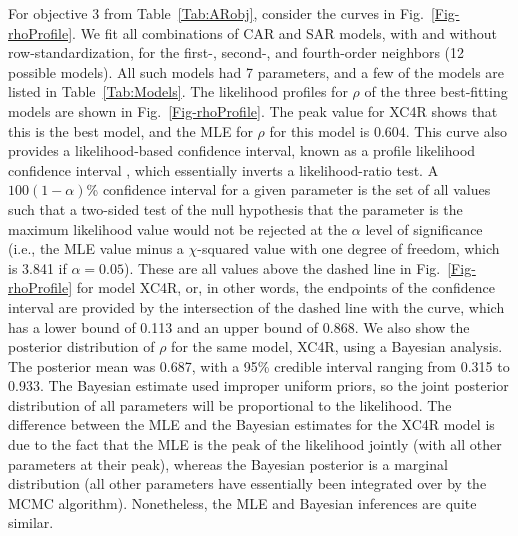 For objective 3 from Table~\ref{Tab:ARobj}, consider the curves in Fig.~\ref{Fig-rhoProfile}.  We fit all combinations of CAR and SAR models, with and without row-standardization, for the first-, second-, and fourth-order neighbors (12 possible models).  All such models had 7 parameters, and a few of the models are listed in Table~\ref{Tab:Models}. The likelihood profiles for $\rho$ of the three best-fitting models are shown in Fig.~\ref{Fig-rhoProfile}. The peak value for XC4R shows that this is the best model, and the MLE for $\rho$ for this model is 0.604.  This curve also provides a likelihood-based confidence interval, known as a profile likelihood confidence interval \citep{Box:Cox:anal:1964}, which essentially inverts a likelihood-ratio test. A $100(1 - \alpha)$\% confidence interval for a given parameter is the set of all values such that a two-sided test of the null hypothesis that the parameter is the maximum likelihood value would not be rejected at the $\alpha$ level of significance (i.e., the MLE value minus a $\chi$-squared value with one degree of freedom, which is 3.841 if $\alpha = 0.05$).  These are all values above the dashed line in Fig.~\ref{Fig-rhoProfile} for model XC4R, or, in other words, the endpoints of the confidence interval are provided by the intersection of the dashed line with the curve, which has a lower bound of 0.113 and an upper bound of 0.868.  We also show the posterior distribution of $\rho$ for the same model, XC4R, using a Bayesian analysis.  The posterior mean was 0.687, with a 95\% credible interval ranging from 0.315 to 0.933.  The Bayesian estimate used improper uniform priors, so the joint posterior distribution of all parameters will be proportional to the likelihood.  The difference between the MLE and the Bayesian estimates for the XC4R model is due to the fact that the MLE is the peak of the likelihood jointly (with all other parameters at their peak), whereas the Bayesian posterior is a marginal distribution (all other parameters have essentially been integrated over by the MCMC algorithm).  Nonetheless, the MLE and Bayesian inferences are quite similar. 

